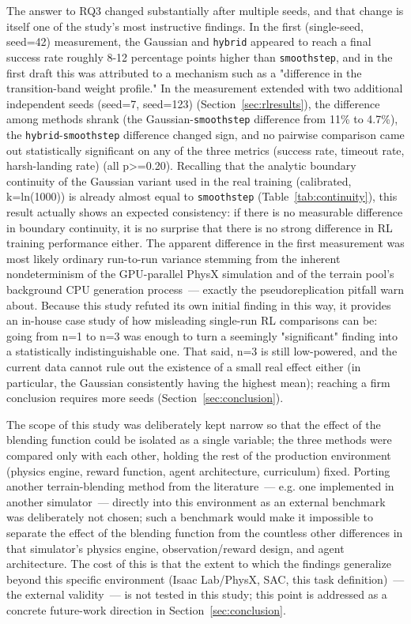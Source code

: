 The answer to RQ3 changed substantially after multiple seeds, and that change is itself one of the study's most instructive findings. In the first (single-seed, seed=42) measurement, the Gaussian and \texttt{hybrid} appeared to reach a final success rate roughly 8-12 percentage points higher than \texttt{smoothstep}, and in the first draft this was attributed to a mechanism such as a "difference in the transition-band weight profile." In the measurement extended with two additional independent seeds (seed=7, seed=123) (Section~\ref{sec:rlresults}), the difference among methods shrank (the Gaussian-\texttt{smoothstep} difference from 11\% to 4.7\%), the \texttt{hybrid}-\texttt{smoothstep} difference changed sign, and no pairwise comparison came out statistically significant on any of the three metrics (success rate, timeout rate, harsh-landing rate) (all p>=0.20). Recalling that the analytic boundary continuity of the Gaussian variant used in the real training (calibrated, k=ln(1000)) is already almost equal to \texttt{smoothstep} (Table~\ref{tab:continuity}), this result actually shows an expected consistency: if there is no measurable difference in boundary continuity, it is no surprise that there is no strong difference in RL training performance either. The apparent difference in the first measurement was most likely ordinary run-to-run variance stemming from the inherent nondeterminism of the GPU-parallel PhysX simulation and of the terrain pool's background CPU generation process~--- exactly the pseudoreplication pitfall \citet{henderson2018} warn about. Because this study refuted its own initial finding in this way, it provides an in-house case study of how misleading single-run RL comparisons can be: going from n=1 to n=3 was enough to turn a seemingly "significant" finding into a statistically indistinguishable one. That said, n=3 is still low-powered, and the current data cannot rule out the existence of a small real effect either (in particular, the Gaussian consistently having the highest mean); reaching a firm conclusion requires more seeds (Section~\ref{sec:conclusion}).

The scope of this study was deliberately kept narrow so that the effect of the blending function could be isolated as a single variable; the three methods were compared only with each other, holding the rest of the production environment (physics engine, reward function, agent architecture, curriculum) fixed. Porting another terrain-blending method from the literature~--- e.g. one implemented in another simulator~--- directly into this environment as an external benchmark was deliberately not chosen; such a benchmark would make it impossible to separate the effect of the blending function from the countless other differences in that simulator's physics engine, observation/reward design, and agent architecture. The cost of this is that the extent to which the findings generalize beyond this specific environment (Isaac Lab/PhysX, SAC, this task definition)~--- the external validity~--- is not tested in this study; this point is addressed as a concrete future-work direction in Section~\ref{sec:conclusion}.

